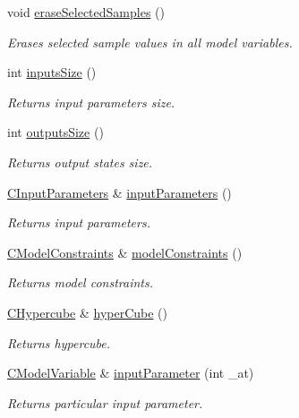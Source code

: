 \begin{DoxyCompactItemize}
void \hyperlink{class_go_s_u_m_1_1_c_container_ac5c3c5a7bafbfd4aec64bd43cca45480}{erase\-Selected\-Samples} ()
\begin{DoxyCompactList}\small\item\em Erases selected sample values in all model variables. \end{DoxyCompactList}\item 
int \hyperlink{class_go_s_u_m_1_1_c_container_aa1370576faa1ddf1488d491c8a998574}{inputs\-Size} ()
\begin{DoxyCompactList}\small\item\em Returns input parameters size. \end{DoxyCompactList}\item 
int \hyperlink{class_go_s_u_m_1_1_c_container_ac19c60a80c0394dccb130fffe2411abc}{outputs\-Size} ()
\begin{DoxyCompactList}\small\item\em Returns output states size. \end{DoxyCompactList}\item 
\hyperlink{class_go_s_u_m_1_1_c_input_parameters}{C\-Input\-Parameters} \& \hyperlink{class_go_s_u_m_1_1_c_container_a7d7755e585f783b99d6e16d4381c5c4d}{input\-Parameters} ()
\begin{DoxyCompactList}\small\item\em Returns input parameters. \end{DoxyCompactList}\item 
\hyperlink{class_go_s_u_m_1_1_c_model_constraints}{C\-Model\-Constraints} \& \hyperlink{class_go_s_u_m_1_1_c_container_a4579e65d7ae46d352a56078360c5666d}{model\-Constraints} ()
\begin{DoxyCompactList}\small\item\em Returns model constraints. \end{DoxyCompactList}\item 
\hyperlink{class_go_s_u_m_1_1_c_hypercube}{C\-Hypercube} \& \hyperlink{class_go_s_u_m_1_1_c_container_a68aa9f1467ca1b17c216caed7ca590bf}{hyper\-Cube} ()
\begin{DoxyCompactList}\small\item\em Returns hypercube. \end{DoxyCompactList}\item 
\hyperlink{class_go_s_u_m_1_1_c_model_variable}{C\-Model\-Variable} \& \hyperlink{class_go_s_u_m_1_1_c_container_a0eac125fff705243cbd0e4da2f588535}{input\-Parameter} (int \-\_\-at)
\begin{DoxyCompactList}\small\item\em Returns particular input parameter. \end{DoxyCompactList}\item 

\end{DoxyCompactItemize}
